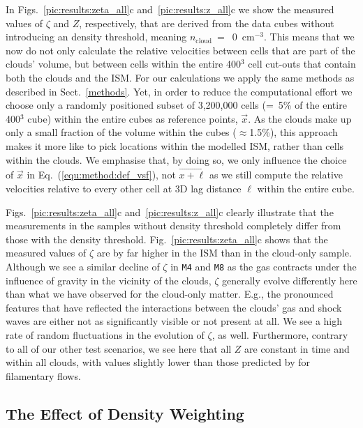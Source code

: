 In Figs.~\ref{pic:results:zeta_all}c and~\ref{pic:results:z_all}c we show the measured values of $\zeta$ and $Z$, respectively, that are derived from the data cubes without introducing an density threshold, meaning $n_\mathrm{cloud}~=$~0~cm$^{-3}$.
This means that we now do not only calculate the relative velocities between cells that are part of the clouds' volume, but between cells within the entire 400$^3$ cell cut-outs that contain both the clouds and the ISM.
For our calculations we apply the same methods as described in Sect.~\ref{methods}. 
Yet, in order to reduce the computational effort we choose only a randomly positioned subset of 3,200,000 cells (=~5\% of the entire 400$^3$ cube) within the entire cubes as reference points, $\vec{x}$. 
As the clouds make up only a small fraction of the volume within the cubes ($\approx$1.5\%), this approach makes it more like to pick locations within the modelled ISM, rather than cells within the clouds. 
We emphasise that, by doing so, we only influence the choice of $\vec{x}$ in Eq.~(\ref{equ:method:def_vsf}), not $\vec{x+\ell}$ as we still compute the relative velocities relative to every other cell at 3D lag distance $\ell$ within the entire cube. 

Figs.~\ref{pic:results:zeta_all}c and~\ref{pic:results:z_all}c clearly illustrate that the measurements in the samples without density threshold completely differ from those with the density threshold.
Fig.~\ref{pic:results:zeta_all}c shows that the measured values of $\zeta$ are by far higher in the ISM than in the cloud-only sample.
Although we see a similar decline of $\zeta$ in \texttt{M4} and \texttt{M8} as the gas contracts under the influence of gravity in the vicinity of the clouds, $\zeta$ generally evolve differently here than what we have observed for the cloud-only matter.
E.g., the pronounced features that have reflected the interactions between the clouds' gas and shock waves are either not as significantly visible or not present at all.
We see a high rate of random fluctuations in the evolution of $\zeta$, as well.
Furthermore, contrary to all of our other test scenarios, we see here that all $Z$ are constant in time and within all clouds, with values slightly lower than those predicted by \citet{She1994} for filamentary flows.


\subsection{The Effect of Density Weighting}\label{results:densweight}

